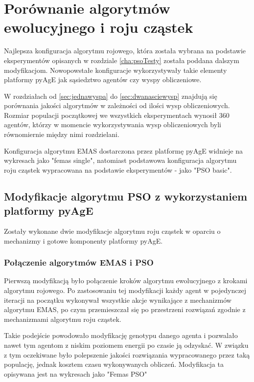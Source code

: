 \chapter{Porównanie algorytmów ewolucyjnego i roju cząstek}
\label{cha:psovsemas}

Najlepsza konfiguracja algorytmu rojowego, która została wybrana na podstawie eksperymentów opisanych w rozdziale \ref{cha:psoTesty} została poddana dalszym modyfikacjom. Nowopowstałe konfiguracje wykorzystywały takie elementy platformy pyAgE jak sąsiedztwo agentów czy wyspy obliczeniowe.

W rozdziałach od \ref{sec:jednawyspa} do \ref{sec:dwanasciewysp} znajdują się porównania jakości algorytmów w zależności od ilości wysp obliczeniowych. Rozmiar populacji początkowej we wszystkich eksperymentach wynosił 360 agentów, którzy w momencie wykorzystywania wysp obliczeniowych byli równomiernie między nimi rozdzielani.

Konfiguracja algorytmu EMAS dostarczona przez platformę pyAgE widnieje na wykresach jako "femas single", natomiast podstawowa konfiguracja algorytmu roju cząstek wypracowana na podstawie eksperymentów - jako "PSO basic".


\section{Modyfikacje algorytmu PSO z wykorzystaniem platformy pyAgE}

Zostały wykonane dwie modyfikacje algorytmu roju cząstek w oparciu o mechanizmy i gotowe komponenty platformy pyAgE.


\subsection{Połączenie algorytmów EMAS i PSO}

Pierwszą modyfikacją było połączenie kroków algorytmu ewolucyjnego z krokami algorytmu rojowego. Po zastosowaniu tej modyfikacji każdy agent w pojedynczej iteracji na początku wykonywał wszystkie akcje wynikające z mechanizmów algorytmu EMAS, po czym przemieszczał się po przestrzeni rozwiązań zgodnie z mechanizmami algorytmu roju cząstek.

Takie podejście powodowało modyfikację genotypu danego agenta i pozwalało nawet tym agentom z niskim poziomem energii po czasie ją odzyskać. W związku z tym oczekiwane było polepszenie jakości rozwiązania wypracowanego przez taką populację, jednak kosztem czasu wykonywanych obliczeń. Modyfikacja ta opisywana jest na wykresach jako "Femas PSO"


